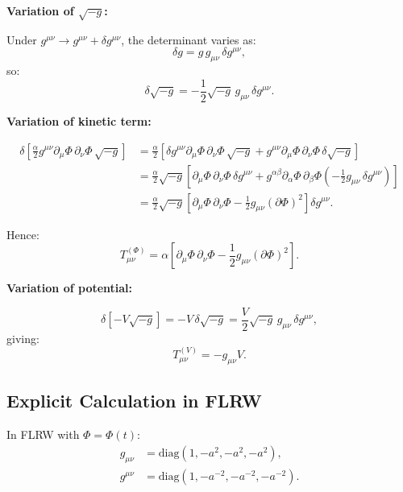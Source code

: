 \documentclass[11pt,a4paper]{article}
\numberwithin{equation}{section}
\theoremstyle{plain}
\theoremstyle{definition}
\theoremstyle{remark}
\begin{document}
\textbf{Variation of $\sqrt{-g}$:}

Under $g^{\mu\nu} \to g^{\mu\nu} + \delta g^{\mu\nu}$, the determinant varies as:
\begin{equation}
\delta g = g\,g_{\mu\nu}\,\delta g^{\mu\nu},
\end{equation}
so:
\begin{equation}
\delta\sqrt{-g} = -\frac{1}{2}\sqrt{-g}\,g_{\mu\nu}\,\delta g^{\mu\nu}.
\end{equation}

\textbf{Variation of kinetic term:}

\begin{align}
\delta\left[\frac{\alpha}{2}g^{\mu\nu}\partial_\mu\Phi\,\partial_\nu\Phi\,\sqrt{-g}\right] &= \frac{\alpha}{2}\left[\delta g^{\mu\nu}\partial_\mu\Phi\,\partial_\nu\Phi\,\sqrt{-g} + g^{\mu\nu}\partial_\mu\Phi\,\partial_\nu\Phi\,\delta\sqrt{-g}\right]\\
&= \frac{\alpha}{2}\sqrt{-g}\left[\partial_\mu\Phi\,\partial_\nu\Phi\,\delta g^{\mu\nu} + g^{\alpha\beta}\partial_\alpha\Phi\,\partial_\beta\Phi\left(-\frac{1}{2}g_{\mu\nu}\,\delta g^{\mu\nu}\right)\right]\\
&= \frac{\alpha}{2}\sqrt{-g}\left[\partial_\mu\Phi\,\partial_\nu\Phi - \frac{1}{2}g_{\mu\nu}(\partial\Phi)^2\right]\delta g^{\mu\nu}.
\end{align}

Hence:
\begin{equation}
T_{\mu\nu}^{(\Phi)} = \alpha\left[\partial_\mu\Phi\,\partial_\nu\Phi - \frac{1}{2}g_{\mu\nu}(\partial\Phi)^2\right].
\end{equation}

\textbf{Variation of potential:}

\begin{equation}
\delta\left[-V\sqrt{-g}\right] = -V\,\delta\sqrt{-g} = \frac{V}{2}\sqrt{-g}\,g_{\mu\nu}\,\delta g^{\mu\nu},
\end{equation}
giving:
\begin{equation}
T_{\mu\nu}^{(V)} = -g_{\mu\nu}V.
\end{equation}

\subsection{Explicit Calculation in FLRW}

In FLRW with $\Phi = \Phi(t)$:
\begin{align}
g_{\mu\nu} &= \mathrm{diag}(1, -a^2, -a^2, -a^2),\\
g^{\mu\nu} &= \mathrm{diag}(1, -a^{-2}, -a^{-2}, -a^{-2}).
\end{align}
\end{document}
